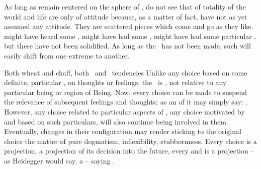 {  As long as  remain centered on the sphere of ,  do
  not see that  of totality of the world and life are only
   of  attitude because, as a matter of fact,  have
  not as yet assumed any attitude.  They are scattered pieces which come and go
  as they like.   might have heard some  , might have
  had some , might have had some particular
  , but these have not been solidified.  As long as the \sch\ has
  not been made, such  will easily shift from one extreme to
  another.  
%
} %


\pa Both wheat and chaff, both \yes\ and \No\ tendencies  Unlike any choice
based on some definite, particular , on thoughts or feelings,
the \sch\ is , not relative to any particular being or
region of Being.  Now, every choice can be made to suspend the relevance of
subsequent feelings and thoughts; as an  of  it may simply
say: .  However, any choice related
to particular aspects of , any choice motivated by and based on
such particulars, will also continue being involved in them.  Eventually,
changes in their configuration may render sticking to the original choice the
matter of pure dogmatism, inflexibility, stubbornness. Every choice is a
projection, a projection of its  decision into the future, every
 and  is a projection -- as Heidegger would say, a
 -- saying .

